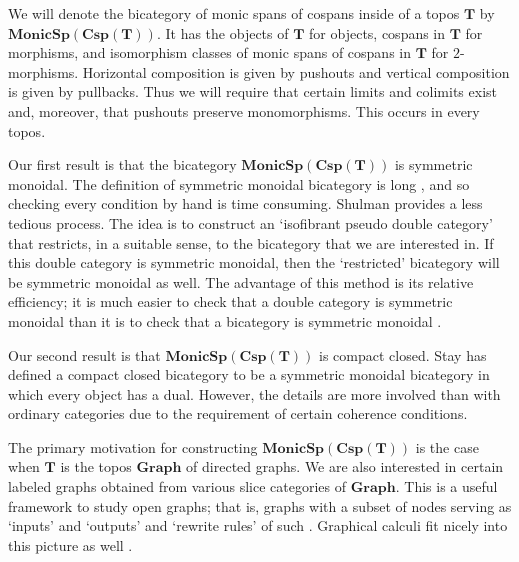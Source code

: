 \documentclass[11pt]{amsart}
\newcommand{\cat}[1]{\mathbf{#1}}
\newcommand{\bimonspcsp}[1]{\mathbf{MonicSp(Csp(#1))}}
\theoremstyle{remark}
\theoremstyle{definition}
\begin{document}
We will denote the bicategory of monic spans of cospans
inside of a topos $\cat{T}$ by $\bimonspcsp{T}$. 
It has the objects of $\cat{T}$
for objects,
cospans in $\cat{T}$ for morphisms,
and isomorphism classes of monic spans of cospans
in $\cat{T}$ for $2$-morphisms.
Horizontal composition is given 
by pushouts and
vertical composition is
given by pullbacks.
Thus we will require that certain 
limits and colimits exist and, moreover, 
that pushouts preserve monomorphisms. 
This occurs in every topos.



Our first result is that 
the bicategory $\bimonspcsp{T}$ 
is symmetric monoidal. 
The definition of 
symmetric monoidal bicategory is long \cite{Stay}, 
and so checking every condition 
by hand is time consuming. 
Shulman 
\cite{Shul} 
provides a less tedious process. 
The idea is to construct an 
`isofibrant pseudo double category' 
that restricts, in a suitable sense, 
to the bicategory 
that we are interested in.  
If this double category is symmetric monoidal, 
then the `restricted' bicategory will be 
symmetric monoidal as well.  
The advantage of this method 
is its relative efficiency; it is much easier to check that 
a double category is symmetric monoidal \cite{Shul}
than it is to check that a bicategory is symmetric monoidal \cite{Stay}.

Our second result is that $\bimonspcsp{T}$ 
is compact closed.
Stay \cite{Stay} has defined a 
compact closed bicategory 
to be a symmetric monoidal bicategory 
in which every object has a dual. 
However, the details are 
more involved than with ordinary categories 
due to the requirement of certain
coherence conditions.

The primary motivation for constructing $\bimonspcsp{T}$ 
is the case when $\cat{T}$ 
is the topos $\cat{Graph}$ 
of directed graphs.
We are also interested in 
certain labeled graphs obtained
from various slice categories of 
$\cat{Graph}$.
This is a useful framework to study 
open graphs; that is, graphs with
a subset of nodes serving as `inputs' and `outputs'
and `rewrite rules' of such \cite{Cic}.
Graphical calculi fit nicely
into this picture as well \cite{Cic_zx}.
\end{document}
